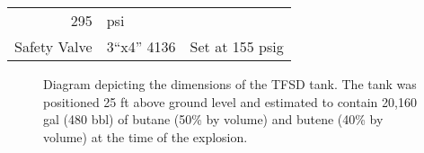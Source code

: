 \documentclass[10pt,parskip=half,
toc=sectionentrywithdots,
bibliography=totocnumbered,
captions=tableheading,numbers=noendperiod]{scrartcl}
\begin{document}
\begin{longtable}[]{@{}rll@{}}
\begin{minipage}[t]{0.23\columnwidth}
295\strut
\end{minipage} & \begin{minipage}[t]{0.23\columnwidth}\raggedright
psi\strut
\end{minipage}\tabularnewline
\begin{minipage}[t]{0.23\columnwidth}\raggedleft
Safety Valve\strut
\end{minipage} & \begin{minipage}[t]{0.23\columnwidth}\raggedright
3``x4'' 4136\strut
\end{minipage} & \begin{minipage}[t]{0.23\columnwidth}\raggedright
Set at 155 psig\strut
\end{minipage}\tabularnewline
\bottomrule
\end{longtable}

\begin{figure}[H]
\hypertarget{fig:fig_tank}{%
\begin{center}
\end{center}
\caption{Diagram depicting the dimensions of the TFSD tank. The tank was
positioned 25 ft above ground level and estimated to contain 20,160 gal
(480 bbl) of butane (50\% by volume) and butene (40\% by volume) at the
time of the explosion.\cite{PES2019}}\label{fig:fig_tank}
}
\end{figure}
\end{document}
